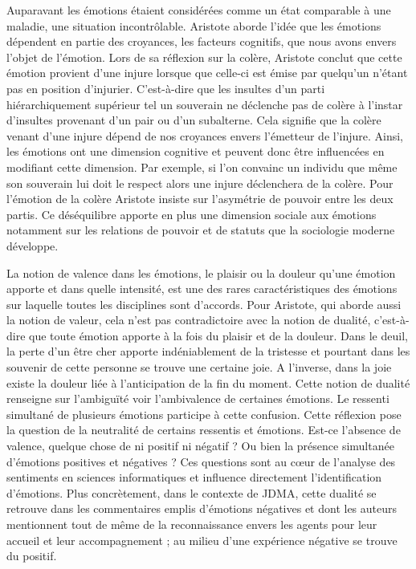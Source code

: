 \documentclass[a4paper,12pt, openany]{book}
\begin{document}
Auparavant les émotions étaient considérées comme un état comparable à une maladie, une situation incontrôlable. Aristote aborde l'idée que les émotions dépendent en partie des croyances, les facteurs cognitifs, que nous avons envers l'objet de l'émotion. Lors de sa réflexion sur la colère, Aristote conclut que cette émotion provient d'une injure lorsque que celle-ci est émise par quelqu'un n'étant pas en position d'injurier. C'est-à-dire que les insultes d'un parti hiérarchiquement supérieur tel un souverain ne déclenche pas de colère à l'instar d'insultes provenant d'un pair ou d'un subalterne. Cela signifie que la colère venant d'une injure dépend de nos croyances envers l'émetteur de l'injure. Ainsi, les émotions ont une dimension cognitive et peuvent donc être influencées en modifiant cette dimension. Par exemple, si l'on convainc un individu que même son souverain lui doit le respect alors une injure déclenchera de la colère. Pour l'émotion de la colère Aristote insiste sur l'asymétrie de pouvoir entre les deux partis. Ce déséquilibre apporte en plus une dimension sociale aux émotions notamment sur les relations de pouvoir et de statuts que la sociologie moderne développe. \par 

La notion de valence dans les émotions, le plaisir ou la douleur qu'une émotion apporte et dans quelle intensité, est une des rares caractéristiques des émotions sur laquelle toutes les disciplines sont d'accords. Pour Aristote, qui aborde aussi la notion de valeur, cela n'est pas contradictoire avec la notion de dualité, c'est-à-dire que toute émotion apporte à la fois du plaisir et de la douleur. Dans le deuil, la perte d'un être cher apporte indéniablement de la tristesse et pourtant dans les souvenir de cette personne se trouve une certaine joie. A l'inverse, dans la joie existe la douleur liée à l'anticipation de la fin du moment. Cette notion de dualité renseigne sur l'ambiguïté voir l'ambivalence de certaines émotions. Le ressenti simultané de plusieurs émotions participe à cette confusion. Cette réflexion pose la question de la neutralité de certains ressentis et émotions. Est-ce l'absence de valence, quelque chose de ni positif ni négatif ? Ou bien la présence simultanée d'émotions positives et négatives ? Ces questions sont au cœur de l'analyse des sentiments en sciences informatiques et influence directement l'identification d'émotions. Plus concrètement, dans le contexte de JDMA, cette dualité se retrouve dans les commentaires emplis d'émotions négatives et dont les auteurs mentionnent tout de même de la reconnaissance envers les agents pour leur accueil et leur accompagnement ; au milieu d'une expérience négative se trouve du positif. \par 
\end{document}

